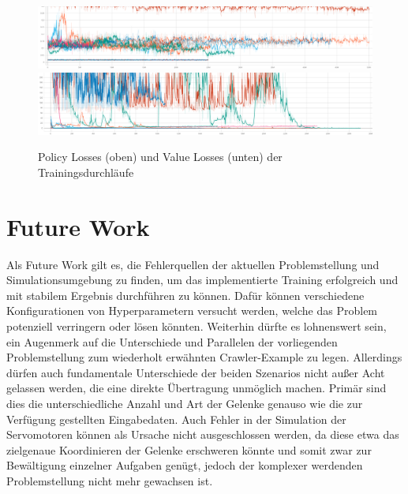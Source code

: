 \begin{figure}
    \centering
    \includegraphics[width = \textwidth]{Bilder/ml-agents/Losses_Policy Loss.pdf}
    \includegraphics[width = \textwidth]{Bilder/ml-agents/Losses_Value Loss.pdf}
    \caption[Policy und Value Losses der Trainingsdurchläufe]{Policy Losses (oben) und Value Losses (unten) der Trainingsdurchläufe}
    \label{fig:losses}
\end{figure}


\section{Future Work}
Als Future Work gilt es, die Fehlerquellen der aktuellen Problemstellung und Simulationsumgebung zu finden, um das implementierte Training erfolgreich und mit stabilem Ergebnis durchführen zu können.
Dafür können verschiedene Konfigurationen von Hyperparametern versucht werden, welche das Problem potenziell verringern oder lösen könnten.
Weiterhin dürfte es lohnenswert sein, ein Augenmerk auf die Unterschiede und Parallelen der vorliegenden Problemstellung zum wiederholt erwähnten Crawler-Example zu legen.
Allerdings dürfen auch fundamentale Unterschiede der beiden Szenarios nicht außer Acht gelassen werden, die eine direkte Übertragung unmöglich machen.
Primär sind dies die unterschiedliche Anzahl und Art der Gelenke genauso wie die zur Verfügung gestellten Eingabedaten.
Auch Fehler in der Simulation der Servomotoren können als Ursache nicht ausgeschlossen werden, da diese etwa das zielgenaue Koordinieren der Gelenke erschweren könnte und somit zwar zur Bewältigung einzelner Aufgaben genügt, jedoch der komplexer werdenden Problemstellung nicht mehr gewachsen ist.

